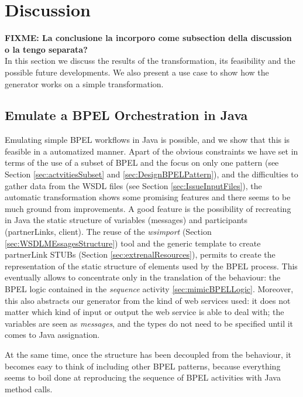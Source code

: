 \section{Discussion}
\label{Discussion}
\textbf{FIXME: La conclusione la incorporo come subsection della discussion o la tengo separata? }\\
In this section we discuss the results of the transformation, its feasibility and the possible future developments. We also present a use case to show how the generator works on a simple transformation.
\subsection{Emulate a BPEL Orchestration in Java}
\label{sec:OrchestrEmulation}
Emulating simple BPEL workflows in Java is possible, and we show that this is feasible in a automatized manner. Apart of the obvious constraints we have set in terms of the use of a subset of BPEL and the focus on only one pattern (see Section \ref{sec:actvitiesSubset} and \ref{sec:DesignBPELPattern}), and the difficulties to gather data from the WSDL files (see Section \ref{sec:IssueInputFiles}), the automatic transformation shows some promising features and there seems to be much ground from improvements.
A good feature is the possibility of recreating in Java the static structure of variables (messages) and participants (partnerLinks, client). The reuse of the \textit{wsimport} (Section \ref{sec:WSDLMEssagesStructure}) tool and the generic template to create partnerLink STUBs (Section \ref{sec:extrenalResources}), permits to create the representation of the static structure of elements used by the BPEL process. This eventually allows to concentrate only in the translation of the behaviour: the BPEL logic contained in the \textit{sequence} activity \ref{sec:mimicBPELLogic}. Moreover, this also abstracts our generator from the kind of web services used: it does not matter which kind of input or output the web service is able to deal with; the variables are seen as \textit{messages}, and the types do not need to be specified until it comes to Java assignation.

At the same time, once the structure has been decoupled from the behaviour, it becomes easy to think of including other BPEL patterns, because everything seems to boil done at reproducing the sequence of BPEL activities with Java method calls. 


